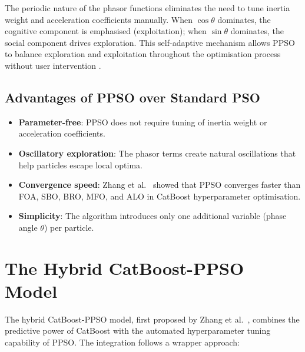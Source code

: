 The periodic nature of the phasor functions eliminates the need to tune inertia weight and acceleration coefficients manually. When $\cos\theta$ dominates, the cognitive component is emphasised (exploitation); when $\sin\theta$ dominates, the social component drives exploration. This self-adaptive mechanism allows PPSO to balance exploration and exploitation throughout the optimisation process without user intervention \parencite{ghasemi2019ppso}.

\subsection{Advantages of PPSO over Standard PSO}

\begin{itemize}
    \item \textbf{Parameter-free}: PPSO does not require tuning of inertia weight or acceleration coefficients.
    \item \textbf{Oscillatory exploration}: The phasor terms create natural oscillations that help particles escape local optima.
    \item \textbf{Convergence speed}: Zhang et al.\ \parencite{zhang2023catboostppso} showed that PPSO converges faster than FOA, SBO, BRO, MFO, and ALO in CatBoost hyperparameter optimisation.
    \item \textbf{Simplicity}: The algorithm introduces only one additional variable (phase angle $\theta$) per particle.
\end{itemize}


\section{The Hybrid CatBoost-PPSO Model}

The hybrid CatBoost-PPSO model, first proposed by Zhang et al.\ \parencite{zhang2023catboostppso}, combines the predictive power of CatBoost with the automated hyperparameter tuning capability of PPSO. The integration follows a wrapper approach:

